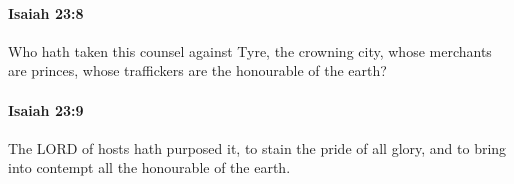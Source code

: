 		\paragraph{Isaiah 23:8} %
			\label{ISAIAH-23-8}

			Who hath taken this counsel against Tyre, the crowning city, whose merchants are princes, whose traffickers are the honourable of the earth?


		\paragraph{Isaiah 23:9} %
			\label{ISAIAH-23-9}

			The LORD of hosts hath purposed it, to stain the pride of all glory, and to bring into contempt all the honourable of the earth.


